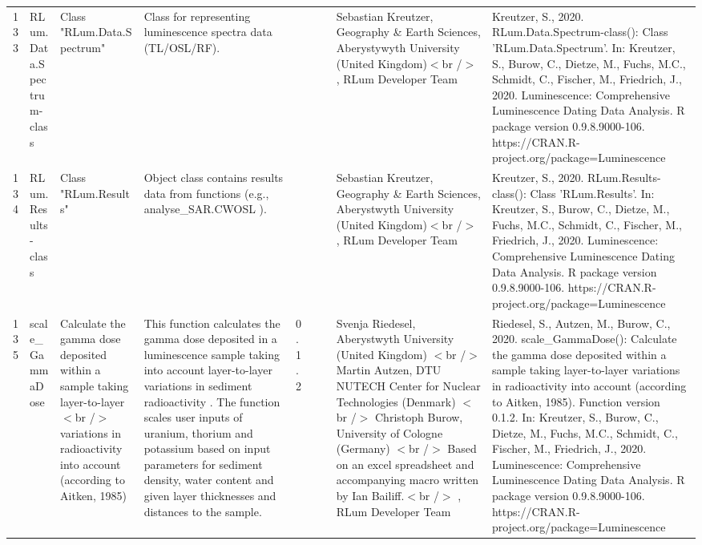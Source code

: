 \begin{table}[ht]
\begin{tabular}{rllllllll}
 \\ 
  133 & RLum.Data.Spectrum-class & Class  "RLum.Data.Spectrum" & Class for representing luminescence spectra data (TL/OSL/RF). &  &  &  & Sebastian Kreutzer, Geography \& Earth Sciences, Aberystywyth University (United Kingdom)$<$br /$>$ , RLum Developer Team & Kreutzer, S., 2020. RLum.Data.Spectrum-class(): Class 'RLum.Data.Spectrum'. In: Kreutzer, S., Burow, C., Dietze, M., Fuchs, M.C., Schmidt, C., Fischer, M., Friedrich, J., 2020. Luminescence: Comprehensive Luminescence Dating Data Analysis. R package version 0.9.8.9000-106. https://CRAN.R-project.org/package=Luminescence
 \\ 
  134 & RLum.Results-class & Class  "RLum.Results" & Object class contains results data from functions (e.g.,  analyse\_SAR.CWOSL ). &  &  &  & Sebastian Kreutzer, Geography \& Earth Sciences, Aberystwyth University (United Kingdom)$<$br /$>$ , RLum Developer Team & Kreutzer, S., 2020. RLum.Results-class(): Class 'RLum.Results'. In: Kreutzer, S., Burow, C., Dietze, M., Fuchs, M.C., Schmidt, C., Fischer, M., Friedrich, J., 2020. Luminescence: Comprehensive Luminescence Dating Data Analysis. R package version 0.9.8.9000-106. https://CRAN.R-project.org/package=Luminescence
 \\ 
  135 & scale\_GammaDose & Calculate the gamma dose deposited within a sample taking layer-to-layer$<$br /$>$ variations in radioactivity into account (according to Aitken, 1985) & This function calculates the gamma dose deposited in a luminescence sample taking into account layer-to-layer variations in sediment radioactivity . The function scales user inputs of uranium, thorium and potassium based on input parameters for sediment density, water content and given layer thicknesses and distances to the sample. & 0.1.2
 &  &  & Svenja Riedesel, Aberystwyth University (United Kingdom)  $<$br /$>$ Martin Autzen, DTU NUTECH Center for Nuclear Technologies (Denmark)  $<$br /$>$ Christoph Burow, University of Cologne (Germany)  $<$br /$>$ Based on an excel spreadsheet and accompanying macro written by Ian Bailiff.$<$br /$>$ , RLum Developer Team & Riedesel, S., Autzen, M., Burow, C., 2020. scale\_GammaDose(): Calculate the gamma dose deposited within a sample taking layer-to-layer variations in radioactivity into account (according to Aitken, 1985). Function version 0.1.2. In: Kreutzer, S., Burow, C., Dietze, M., Fuchs, M.C., Schmidt, C., Fischer, M., Friedrich, J., 2020. Luminescence: Comprehensive Luminescence Dating Data Analysis. R package version 0.9.8.9000-106. https://CRAN.R-project.org/package=Luminescence

\end{tabular}
\end{table}

